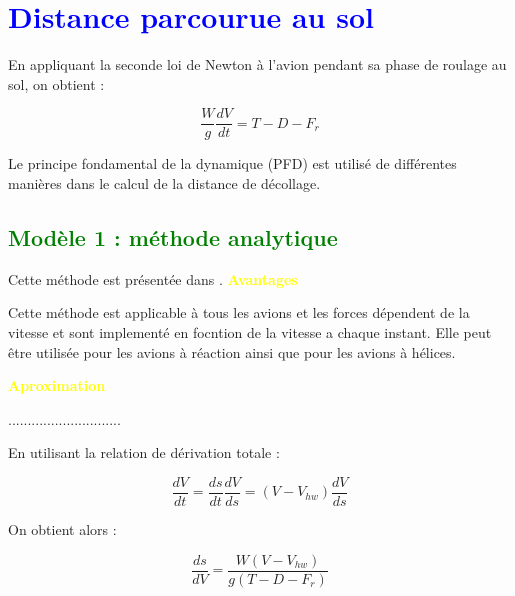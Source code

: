 \section{\textcolor{blue}{Distance parcourue au sol} }

En appliquant la seconde loi de Newton à l’avion pendant sa phase de roulage au sol, on obtient :

\begin{equation}
	\frac{W}{g}\frac{dV}{dt}=T-D-F_r
	\tag{1.1}
\end{equation}

Le principe fondamental de la dynamique (PFD) est utilisé de différentes manières dans le calcul de la distance de décollage.
	
	\subsection{\textcolor{green} {Modèle 1 : méthode analytique} }
	Cette méthode est présentée dans \cite{War:09}. 
	\textbf{\textcolor{yellow}{Avantages}}
	
	Cette méthode est applicable à tous les avions et les forces dépendent de la vitesse et sont implementé en focntion de la vitesse a chaque instant. Elle peut être utilisée pour les avions à réaction ainsi que pour les avions à hélices.
	
	\vspace{0.3cm}
	
	\textbf{\textcolor{yellow}{Aproximation}}
	
	.............................
	
	\vspace{0.3cm}
	
	
	En utilisant la relation de dérivation totale :
	
	\begin{equation}
		\frac{dV}{dt}=\frac{ds}{dt}\frac{dV}{ds}=(V-V_{hw})\frac{dV}{ds}
	\end{equation}
	
	On obtient alors :
	
	\begin{equation}
		\frac{ds}{dV}=\frac{W(V-V_{hw})}{g(T-D-F_r)}
	\end{equation}
	
